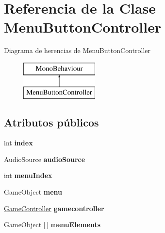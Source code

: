 \hypertarget{class_menu_button_controller}{}\section{Referencia de la Clase Menu\+Button\+Controller}
\label{class_menu_button_controller}
Diagrama de herencias de Menu\+Button\+Controller\begin{figure}[H]
\begin{center}
\leavevmode
\includegraphics[height=2.000000cm]{class_menu_button_controller}
\end{center}
\end{figure}
\subsection*{Atributos públicos}
\begin{DoxyCompactItemize}
\item 
\mbox{\label{class_menu_button_controller_a9ace41802cf1208b58b273b7b1899cde}} 
int {\bfseries index}
\item 
\mbox{\label{class_menu_button_controller_a376d6b46942d5c13b82f65ffe72a08e7}} 
Audio\+Source {\bfseries audio\+Source}
\item 
\mbox{\label{class_menu_button_controller_a3dbec2d2050f0a3ae193a24d4c0de476}} 
int {\bfseries menu\+Index}
\item 
\mbox{\label{class_menu_button_controller_a75259744d220166be13ba3340b1e05e0}} 
Game\+Object {\bfseries menu}
\item 
\mbox{\label{class_menu_button_controller_a1b393f1815311786b80cc8606ea37dfe}} 
\mbox{\hyperlink{class_game_controller}{Game\+Controller}} {\bfseries gamecontroller}
\item 
\mbox{\label{class_menu_button_controller_a9202fbe7e5774bb7bef40bf902fc54b1}} 
Game\+Object \mbox{[}$\,$\mbox{]} {\bfseries menu\+Elements}
\end{DoxyCompactItemize}
